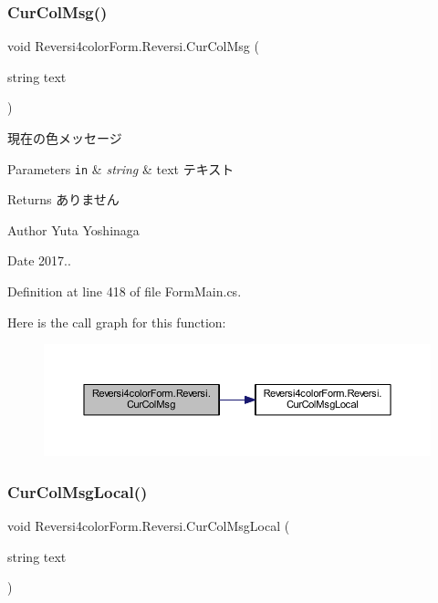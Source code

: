 \subsubsection{\texorpdfstring{Cur\+Col\+Msg()}{CurColMsg()}}
{\footnotesize\ttfamily void Reversi4color\+Form.\+Reversi.\+Cur\+Col\+Msg (\begin{DoxyParamCaption}\item[{string}]{text }\end{DoxyParamCaption})}



現在の色メッセージ 


\begin{DoxyParams}[1]{Parameters}
\mbox{\tt in}  & {\em string} & text テキスト \\
\hline
\end{DoxyParams}
\begin{DoxyReturn}{Returns}
ありません 
\end{DoxyReturn}
\begin{DoxyAuthor}{Author}
Yuta Yoshinaga 
\end{DoxyAuthor}
\begin{DoxyDate}{Date}
2017.. 
\end{DoxyDate}


Definition at line 418 of file Form\+Main.\+cs.

Here is the call graph for this function\+:\nopagebreak
\begin{figure}[H]
\begin{center}
\leavevmode
\includegraphics[width=350pt]{class_reversi4color_form_1_1_reversi_acb7220a84f599ebf736216cc055b2ae3_cgraph}
\end{center}
\end{figure}
\mbox{\label{class_reversi4color_form_1_1_reversi_a6ab2074a5474736e76644cf45c08827b}} 
\subsubsection{\texorpdfstring{Cur\+Col\+Msg\+Local()}{CurColMsgLocal()}}
{\footnotesize\ttfamily void Reversi4color\+Form.\+Reversi.\+Cur\+Col\+Msg\+Local (\begin{DoxyParamCaption}\item[{string}]{text }\end{DoxyParamCaption})}



